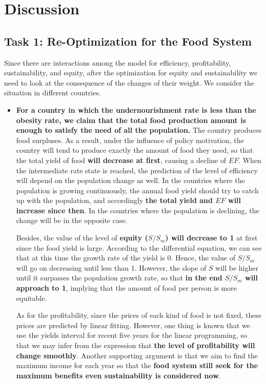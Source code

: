 \documentclass[12pt]{article}
\begin{document}
\section{Discussion}
\subsection{Task 1: Re-Optimization for the Food System}

Since there are interactions among the model for efficiency, profitability, sustainability, and equity, after the optimization for equity and sustainability we need to look at the consequence of the changes of their weight. We consider the situation in different countries. 

\begin{itemize}
    \item \textbf{For a country in which the undernourishment rate is less than the obesity rate, we claim that the total food production amount is enough to satisfy the need of all the population.} The country produces food surpluses. As a result, under the influence of policy motivation, the country will tend to produce exactly the amount of food they need, so that the total yield of food \textbf{will decrease at first}, causing a decline of $EF$. When the intermediate rate state is reached, the prediction of the level of efficiency will depend on the population change as well. In the countries where the population is growing continuously, the annual food yield should try to catch up with the population, and accordingly \textbf{the total yield and $EF$ will increase since then}. In the countries where the population is declining, the change will be in the opposite case.
    
    Besides, the value of the level of \textbf{equity ($S/S_m$) will decrease to 1} at first since the food yield is large. According to the differential equation, we can see that at this time the growth rate of the yield is 0. Hence, the value of $S/S_m$ will go on decreasing until less than 1. However, the slope of $S$ will be higher until it surpasses the population growth rate, so that \textbf{in the end $S/S_m$ will approach to 1}, implying that the amount of food per person is more equitable. 
    
    As for the profitability, since the prices of each kind of food is not fixed, these prices are predicted by linear fitting. However, one thing is known that we use the yields interval for recent five years for the linear programming, so that we may infer from the expression that \textbf{the level of profitability will change smoothly}. Another supporting argument is that we aim to find the maximum income for each year so that the \textbf{food system still seek for the maximum benefits even sustainability is considered now}.
    

\end{itemize}
\end{document}
